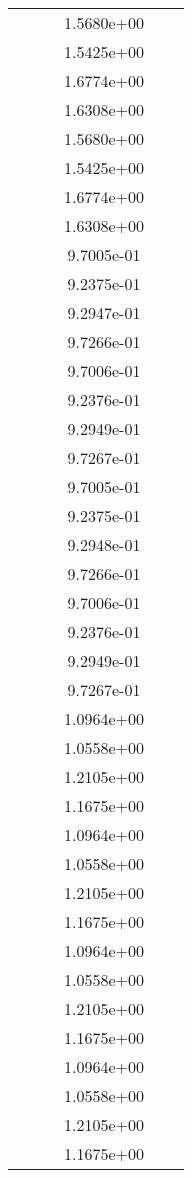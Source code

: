 \begin{xltabular}{\textwidth}{r|rS[table-format=1.3e+2]S[table-format=1.4e+2]S[table-format=1.4e+2]S[table-format=-1.5]}
&  &  & 1.5680e+00 & & \\
&  &  & 1.5425e+00 & & \\
&  &  & 1.6774e+00 & & \\
&  &  & 1.6308e+00 & & \\
&  &  & 1.5680e+00 & & \\
&  &  & 1.5425e+00 & & \\
&  &  & 1.6774e+00 & & \\
&  &  & 1.6308e+00 & & \\
&  &  & 9.7005e-01 & & \\
&  &  & 9.2375e-01 & & \\
&  &  & 9.2947e-01 & & \\
&  &  & 9.7266e-01 & & \\
&  &  & 9.7006e-01 & & \\
&  &  & 9.2376e-01 & & \\
&  &  & 9.2949e-01 & & \\
&  &  & 9.7267e-01 & & \\
&  &  & 9.7005e-01 & & \\
&  &  & 9.2375e-01 & & \\
&  &  & 9.2948e-01 & & \\
&  &  & 9.7266e-01 & & \\
&  &  & 9.7006e-01 & & \\
&  &  & 9.2376e-01 & & \\
&  &  & 9.2949e-01 & & \\
&  &  & 9.7267e-01 & & \\
&  &  & 1.0964e+00 & & \\
&  &  & 1.0558e+00 & & \\
&  &  & 1.2105e+00 & & \\
&  &  & 1.1675e+00 & & \\
&  &  & 1.0964e+00 & & \\
&  &  & 1.0558e+00 & & \\
&  &  & 1.2105e+00 & & \\
&  &  & 1.1675e+00 & & \\
&  &  & 1.0964e+00 & & \\
&  &  & 1.0558e+00 & & \\
&  &  & 1.2105e+00 & & \\
&  &  & 1.1675e+00 & & \\
&  &  & 1.0964e+00 & & \\
&  &  & 1.0558e+00 & & \\
&  &  & 1.2105e+00 & & \\
&  &  & 1.1675e+00 & & \\

\end{xltabular}
